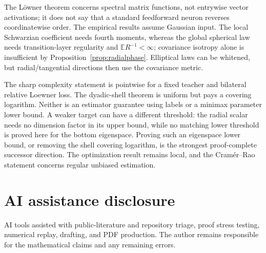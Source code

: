 \documentclass[11pt]{article}
\newcommand{\E}{\mathbb E}
\begin{document}
The L\"owner theorem concerns spectral matrix functions, not entrywise vector activations; it does not say that a
standard feedforward neuron reverses coordinatewise order.  The empirical results assume Gaussian input.  The
local Schwarzian coefficient needs fourth moments, whereas the global spherical law needs transition-layer
regularity and $\E R^{-1}<\infty$; covariance isotropy alone is insufficient by Proposition~\ref{prop:radialphase}.
Elliptical laws can be whitened, but radial/tangential directions then use the covariance metric.

The sharp complexity statement is pointwise for a fixed teacher and bilateral relative Loewner loss.  The dyadic-shell
theorem is uniform but pays a covering logarithm.  Neither is an estimator guarantee using labels or a minimax
parameter lower bound.  A weaker target can have a different threshold: the radial scalar needs no dimension
 factor in its upper bound, while no matching lower threshold is proved here for the bottom eigenspace.  Proving
such an eigenspace lower bound, or
removing the shell covering logarithm, is the strongest proof-complete successor direction.  The optimization
result remains local, and the Cram\'er--Rao statement concerns regular unbiased estimation.

\section*{AI assistance disclosure}
AI tools assisted with public-literature and repository triage, proof stress testing, numerical replay, drafting, and
PDF production.  The author remains responsible for the mathematical claims and any remaining errors.
\end{document}
